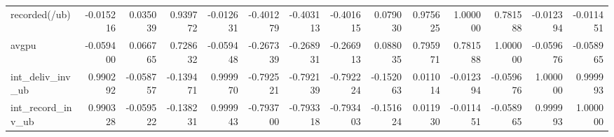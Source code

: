 \begin{tabular}{lrrrrrrrrrrrrr}
recorded(/ub)     & -0.015216 &     0.035039 &   0.939772 &      -0.012631 & -0.401279 & -0.403113 & -0.401615 &  0.079030 &        0.975625 &       1.000000 &  0.781588 &         -0.012394 &          -0.011451 \\
avgpu             & -0.059400 &     0.066765 &   0.728632 &      -0.059448 & -0.267339 & -0.268931 & -0.266913 &  0.088035 &        0.795971 &       0.781588 &  1.000000 &         -0.059676 &          -0.058965 \\
int\_deliv\_inv\_ub  &  0.990292 &    -0.058757 &  -0.139471 &       0.999970 & -0.792521 & -0.792139 & -0.792224 & -0.152063 &        0.011014 &      -0.012394 & -0.059676 &          1.000000 &           0.999993 \\
int\_record\_inv\_ub &  0.990328 &    -0.059522 &  -0.138231 &       0.999943 & -0.793700 & -0.793318 & -0.793403 & -0.151624 &        0.011930 &      -0.011451 & -0.058965 &          0.999993 &           1.000000 \\
\bottomrule
\end{tabular}
